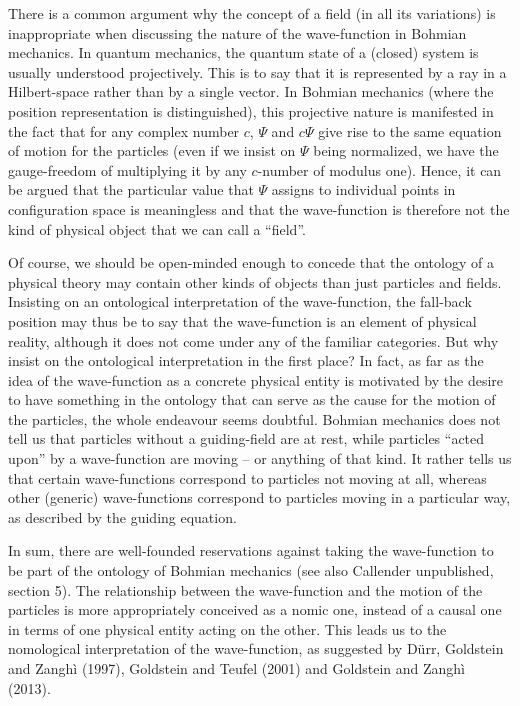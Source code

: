 \documentclass[12pt]{article}
\theoremstyle{definition}
\begin{document}
There is a common argument why the concept of a field (in all its variations) is inappropriate when discussing the nature of the wave-function in Bohmian mechanics. In quantum mechanics, the quantum state of a (closed) system is usually understood projectively. This is to say that it is represented by a ray in a Hilbert-space rather than by a single vector. In Bohmian mechanics (where the position representation is distinguished), this projective nature is manifested in the fact that for any complex number $c$, $\Psi$ and $c\Psi$ give rise to the same equation of motion for the particles (even if we insist on $\Psi$ being normalized, we have the gauge-freedom of multiplying it by any $c$-number of modulus one). Hence, it can be argued that the particular value that $\Psi$ assigns to individual points in configuration space is meaningless and that the wave-function is therefore not the kind of physical object that we can call a ``field''.

Of course, we should be open-minded enough to concede that the ontology of a physical theory may contain other kinds of objects than just particles and fields. Insisting on an ontological interpretation of the wave-function, the fall-back position may thus be to say that the wave-function is an element of physical reality, although it does not come under any of the familiar categories. But why insist on the ontological interpretation in the first place? In fact, as far as the idea of the wave-function as a concrete physical entity is motivated by the desire to have something in the ontology that can serve as the cause for the motion of the particles, the whole endeavour seems doubtful. Bohmian mechanics does not tell us that particles without a guiding-field are at rest, while particles ``acted upon'' by a wave-function are moving -- or anything of that kind. It rather tells us that certain wave-functions correspond to particles not moving at all, whereas other (generic) wave-functions correspond to particles moving in a particular way, as described by the guiding equation.

In sum, there are well-founded reservations against taking the wave-function to be part of the ontology of Bohmian mechanics (see also Callender unpublished, section 5). The relationship between the wave-function and the motion of the particles is more appropriately conceived as a nomic one, instead of a causal one in terms of one physical entity acting on the other. This leads us to the nomological interpretation of the wave-function, as suggested by D\"urr, Goldstein and Zangh\`i (1997), Goldstein and Teufel (2001) and Goldstein and Zangh\`i (2013).
\end{document}
